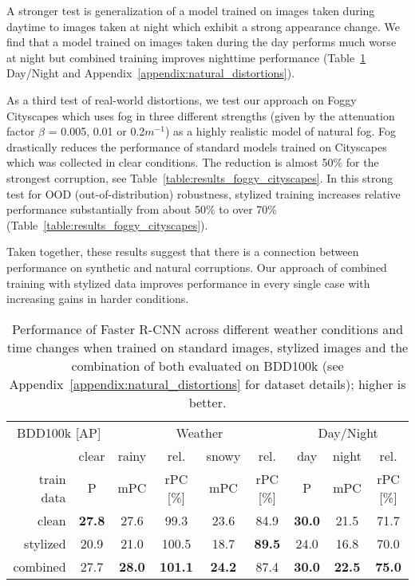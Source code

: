 \documentclass{article}
\newcommand{\highlight}[1]{{\cellcolor{gray.220} #1}}
\begin{document}
A stronger test is generalization of a model trained on images taken during daytime to images taken at night which exhibit a strong appearance change. We find that a model trained on images taken during the day performs much worse at night but combined training improves nighttime performance (Table~\ref{table:results_bdd100k} Day/Night and Appendix~\ref{appendix:natural_distortions}).

As a third test of real-world distortions, we test our approach on Foggy Cityscapes \cite{Sakaridis18foggycityscapes} which uses fog in three different strengths (given by the attenuation factor $\beta$ = 0.005, 0.01 or 0.2$m^{-1}$) as a highly realistic model of natural fog. Fog drastically reduces the performance of standard models trained on Cityscapes which was collected in clear conditions. The reduction is almost 50\% for the strongest corruption, see Table~\ref{table:results_foggy_cityscapes}. In this strong test for OOD (out-of-distribution) robustness, stylized training increases relative performance substantially from about 50\% to over 70\% (Table~\ref{table:results_foggy_cityscapes}).

Taken together, these results suggest that there is a connection between performance on synthetic and natural corruptions. Our approach of combined training with stylized data improves performance in every single case with increasing gains in harder conditions.

\begin{table}[t]\footnotesize
\begin{center}
\begin{tabular}{r|c|cc|cc||c|cc}
\toprule
\multicolumn{2}{c|}{BDD100k [AP]} & \multicolumn{4}{c||}{Weather}& \multicolumn{3}{c}{Day/Night} \\
& clear & \highlight{rainy} & rel. & \highlight{snowy} & rel. & day & \highlight{night} & rel.\\
train data & P & \highlight{mPC} & rPC [\%] & \highlight{mPC} & rPC [\%] & P & \highlight{mPC} & rPC [\%] \\
\hline
clean & \textbf{27.8} & \highlight{27.6} & 99.3  & \highlight{23.6} & 84.9 & \textbf{30.0} & \highlight{21.5} & 71.7 \\
\hline
stylized & 20.9 & \highlight{21.0} & 100.5 & \highlight{18.7} & \textbf{89.5} & 24.0 & \highlight{16.8} & 70.0\\
combined & 27.7 & \highlight{\textbf{28.0}} & \textbf{101.1}  & \highlight{\textbf{24.2}} & 87.4 & \textbf{30.0} & \highlight{\textbf{22.5}} & \textbf{75.0}\\
\bottomrule
\end{tabular}
\caption{Performance of Faster R-CNN across different weather conditions and time changes when trained on standard images, stylized images and the combination of both evaluated on BDD100k (see Appendix~\ref{appendix:natural_distortions} for dataset details); higher is better.}
\label{table:results_bdd100k}
\vspace{-0.3cm}
\end{center}
\end{table}
\end{document}
